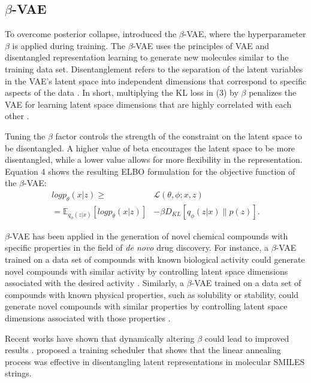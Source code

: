 \subsection{$\beta$-VAE}
To overcome posterior collapse, \cite{higgins2016beta} introduced the $\beta$-VAE, where the hyperparameter $\beta$ is applied during training. The $\beta$-VAE uses the principles of VAE and disentangled representation learning to generate new molecules similar to the training data set. Disentanglement refers to the separation of the latent variables in the VAE's latent space into independent dimensions that correspond to specific aspects of the data \cite{mathieu2019disentangling}. In short, multiplying the KL loss in (3) by $\beta$ penalizes the VAE for learning latent space dimensions that are highly correlated with each other \cite{burgess2018understanding}.

Tuning the $\beta$ factor controls the strength of the constraint on the latent space to be disentangled. A higher value of beta encourages the latent space to be more disentangled, while a lower value allows for more flexibility in the representation. Equation 4 shows the resulting ELBO formulation for the objective function of the $\beta$-VAE:
\begin{equation}
\begin{split}
log p_\theta(x|z) \geq & \mathcal{L}(\theta,\phi;x,z) \\= \mathbb{E}_{q_\phi(z|x)}[log p_\theta(x|z)]
& - \beta D_{KL}[q_\phi(z|x)\parallel p(z)]. \label{eq}
\end{split}
\end{equation}

$\beta$-VAE has been applied in the generation of novel chemical compounds with specific properties in the field of \textit{de novo} drug discovery. For instance, a $\beta$-VAE trained on a data set of compounds with known biological activity could generate novel compounds with similar activity by controlling latent space dimensions associated with the desired activity \cite{gomez2018automatic}. Similarly, a $\beta$-VAE trained on a data set of compounds with known physical properties, such as solubility or stability, could generate novel compounds with similar properties by controlling latent space dimensions associated with those properties \cite{higgins2016beta, burgess2018understanding, gomez2018automatic}. 

Recent works have shown that dynamically altering $\beta$ could lead to improved results \cite{rydhmer2021dynamic}. \cite{bowman2015generating} proposed a training scheduler that shows that the linear annealing process was effective in disentangling latent representations in molecular SMILES strings.

